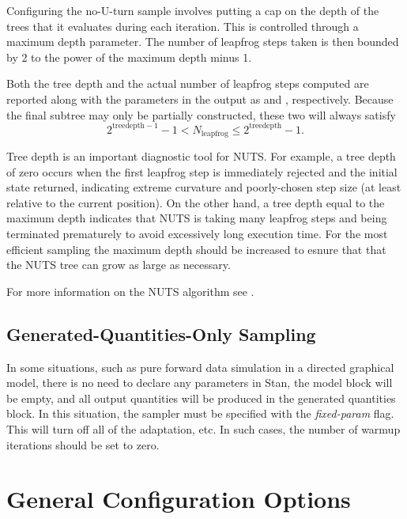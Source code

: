 Configuring the no-U-turn sample involves putting a cap on the depth
of the trees that it evaluates during each iteration.   This is
controlled through a maximum depth parameter.   The number of leapfrog
steps taken is then bounded by 2 to the power of the maximum depth minus 1. 

Both the tree depth and the actual number of leapfrog steps computed
are reported along with the parameters in the output as
 and , respectively. Because
the final subtree may only be partially constructed, these two will
always satisfy
%
\[
2^{\mathrm{treedepth} - 1} - 1 < N_{\mathrm{leapfrog}} \le 2^{\mathrm{treedepth} } - 1.
\]

Tree depth is an important diagnostic tool for NUTS. For example, a
tree depth of zero occurs when the first leapfrog step is immediately
rejected and the initial state returned, indicating extreme curvature
and poorly-chosen step size (at least relative to the current
position). On the other hand, a tree depth equal to the maximum depth
indicates that NUTS is taking many leapfrog steps and being terminated
prematurely to avoid excessively long execution time. For the most
efficient sampling the maximum depth should be increased to esnure
that that the NUTS tree can grow as large as necessary.

For more information on the NUTS algorithm see
\citep{Hoffman-Gelman:2011, Hoffman-Gelman:2014}.






\subsection{Generated-Quantities-Only Sampling}

In some situations, such as pure forward data simulation in a directed
graphical model, there is no need to declare any parameters in Stan,
the model block will be empty, and all output quantities will be
produced in the generated quantities block. In this situation, the
sampler must be specified with the {\it fixed-param} flag. This will
turn off all of the adaptation, etc. In such cases, the number of
warmup iterations should be set to zero.


\section{General Configuration Options}\label{general-config.section}

